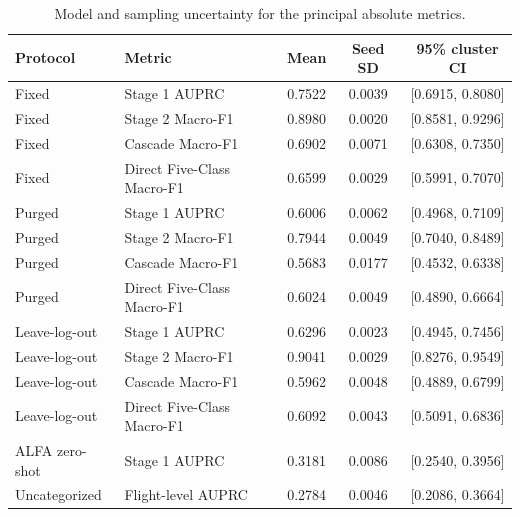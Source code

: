\begin{table}[H]
\caption{Model and sampling uncertainty for the principal absolute metrics.}
\label{tab:absolute_uncertainty}
\centering
\footnotesize
\renewcommand{\arraystretch}{1.08}
\begin{tabularx}{\textwidth}{@{}>{\RaggedRight\arraybackslash}p{2.55cm} >{\RaggedRight\arraybackslash}X c c c@{}}
\toprule
\textbf{Protocol} & \textbf{Metric} & \textbf{Mean} & \textbf{Seed SD} & \textbf{95\% cluster CI}\\
\midrule
Fixed & Stage 1 AUPRC & 0.7522 & 0.0039 & [0.6915, 0.8080]\\
Fixed & Stage 2 Macro-F1 & 0.8980 & 0.0020 & [0.8581, 0.9296]\\
Fixed & Cascade Macro-F1 & 0.6902 & 0.0071 & [0.6308, 0.7350]\\
Fixed & Direct Five-Class Macro-F1 & 0.6599 & 0.0029 & [0.5991, 0.7070]\\
Purged & Stage 1 AUPRC & 0.6006 & 0.0062 & [0.4968, 0.7109]\\
Purged & Stage 2 Macro-F1 & 0.7944 & 0.0049 & [0.7040, 0.8489]\\
Purged & Cascade Macro-F1 & 0.5683 & 0.0177 & [0.4532, 0.6338]\\
Purged & Direct Five-Class Macro-F1 & 0.6024 & 0.0049 & [0.4890, 0.6664]\\
Leave-log-out & Stage 1 AUPRC & 0.6296 & 0.0023 & [0.4945, 0.7456]\\
Leave-log-out & Stage 2 Macro-F1 & 0.9041 & 0.0029 & [0.8276, 0.9549]\\
Leave-log-out & Cascade Macro-F1 & 0.5962 & 0.0048 & [0.4889, 0.6799]\\
Leave-log-out & Direct Five-Class Macro-F1 & 0.6092 & 0.0043 & [0.5091, 0.6836]\\
ALFA zero-shot & Stage 1 AUPRC & 0.3181 & 0.0086 & [0.2540, 0.3956]\\
Uncategorized & Flight-level AUPRC & 0.2784 & 0.0046 & [0.2086, 0.3664]\\

\bottomrule
\end{tabularx}
\par\vspace{2pt}{\scriptsize Cluster intervals use 1000 repetitions (seed 20260825). UAV-SEAD resamples complete test logs, ALFA resamples sequences, and Uncategorized screening resamples flights.}
\end{table}